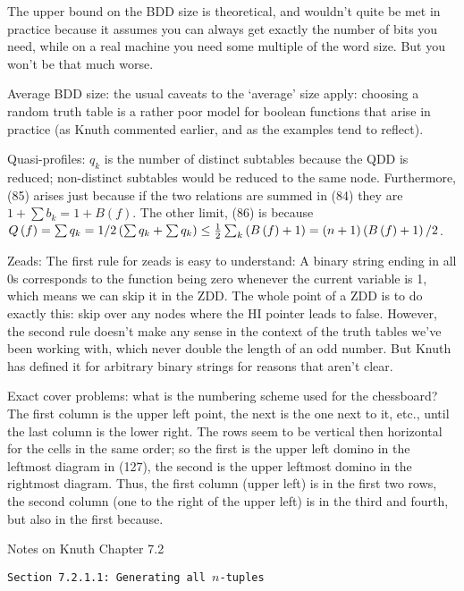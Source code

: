 \noindent [p 234] The upper bound on the BDD size is theoretical,
and wouldn't quite be met in practice because it assumes you
can always get exactly the number of bits you need, while
on a real machine you need some multiple of the word size.
But you won't be that much worse.

\vskip 0.08in \noindent [p 234] Average BDD size: the usual
caveats to the `average' size apply: choosing a random truth
table is a rather poor model for boolean functions that arise
in practice (as Knuth commented earlier, and as the examples
tend to reflect).

\vskip 0.08in \noindent [p 235] Quasi-profiles: $q_k$ is the
number of distinct subtables because the QDD is reduced;
non-distinct subtables would be reduced to the same node.
Furthermore, (85)  arises just because if the two relations
are summed in (84) they are $1 + \sum b_k = 1 + B\left(f\right)$.
The other limit, (86) is because
$Q\left(f\right) = \sum q_k =
1/2 \left(\sum q_k + \sum q_k\right)
\le {1 \over 2} \sum_k \left(B\left(f\right) + 1\right) = \left(n + 1\right)
\left(B\left(f\right) + 1\right) / 2$.

\vskip 0.08in 

\noindent [p 250] Zeads: The first rule for zeads is easy to 
understand: A binary string ending in all 0s corresponds to
the function being zero whenever the current variable is 1, which 
means we can skip it in the ZDD.  The whole point of a ZDD
is to do exactly this: skip over any nodes where the HI pointer
leads to false.  However, the second rule doesn't
make any sense in the context of the truth tables we've been working
with, which never double the length of an odd number.  But Knuth
has defined it for arbitrary binary strings for reasons that aren't
clear.

\vskip 0.08in \noindent [p 251] Exact cover problems: what is
the numbering scheme used for the chessboard?  The first
column is the upper left point, the next is the one next to it, etc.,
until the last column is the lower right.  The rows seem to be
vertical then horizontal for the cells in the same order;
so the first is the upper left domino in the leftmost diagram in (127),
the second is the upper leftmost domino in the rightmost
diagram.  Thus, the first column (upper left) is in the first two rows,
the second column (one to the right of the upper left) is
in the third and fourth, but also in the first because.


\vfil\break
\centerline{Notes on Knuth Chapter 7.2}
\vskip 0.3in
\centerline {\tt Section 7.2.1.1: Generating all $n$-tuples}
\vskip 0.2in

